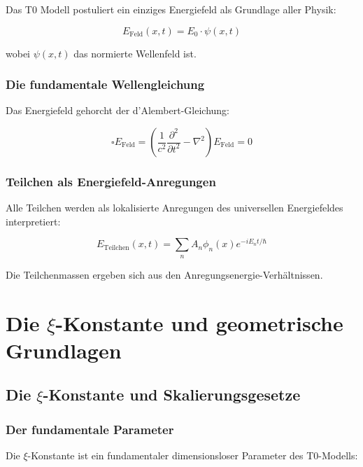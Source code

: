 	Das T0 Modell postuliert ein einziges Energiefeld als Grundlage aller Physik:
	
	\begin{equation}
		E_{\text{Feld}}(x,t) = E_0 \cdot \psi(x,t)
	\end{equation}
	
	wobei $\psi(x,t)$ das normierte Wellenfeld ist.
	
	\subsection{Die fundamentale Wellengleichung}
	
	Das Energiefeld gehorcht der d'Alembert-Gleichung:
	
	\begin{equation}
		\square E_{\text{Feld}} = \left(\frac{1}{c^2}\frac{\partial^2}{\partial t^2} - \nabla^2\right) E_{\text{Feld}} = 0
	\end{equation}
	
	\subsection{Teilchen als Energiefeld-Anregungen}
	
	Alle Teilchen werden als lokalisierte Anregungen des universellen Energiefeldes interpretiert:
	
	\begin{equation}
		E_{\text{Teilchen}}(x,t) = \sum_n A_n \phi_n(x) e^{-iE_n t/\hbar}
	\end{equation}
	
	Die Teilchenmassen ergeben sich aus den Anregungsenergie-Verhältnissen.
	
	\chapter{Die $\xi$-Konstante und geometrische Grundlagen}
	
\section{Die $\xi$-Konstante und Skalierungsgesetze}

\subsection{Der fundamentale Parameter}

Die $\xi$-Konstante ist ein fundamentaler dimensionsloser Parameter des T0-Modells:

